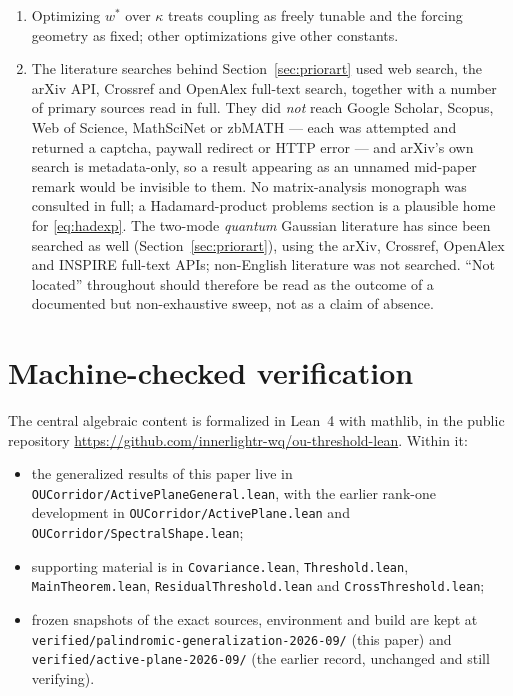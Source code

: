 \documentclass[11pt]{article}
\theoremstyle{plain}
\theoremstyle{definition}
\theoremstyle{remark}
\begin{document}
\begin{enumerate}
  and forced nodes satisfy the hypothesis, and no general bound on $w^{*}_{\min}$ over graphs.
\item Optimizing $w^{*}$ over $\kappa$ treats coupling as freely tunable and the forcing
  geometry as fixed; other optimizations give other constants.
\item The literature searches behind Section~\ref{sec:priorart} used web search, the arXiv API,
  Crossref and OpenAlex full-text search, together with a number of primary sources read in
  full. They did \emph{not} reach Google Scholar, Scopus, Web of Science, MathSciNet or zbMATH ---
  each was attempted and returned a captcha, paywall redirect or HTTP error ---
  and arXiv's own search is metadata-only, so a result appearing as an unnamed mid-paper remark
  would be invisible to them. No matrix-analysis monograph was consulted in full; a
  Hadamard-product problems section is a plausible home for \eqref{eq:hadexp}. The two-mode \emph{quantum} Gaussian literature has since been searched as well
  (Section~\ref{sec:priorart}), using the arXiv, Crossref, OpenAlex and INSPIRE full-text APIs;
  non-English literature was not searched.
  ``Not located'' throughout should therefore be read as the outcome of a documented but
  non-exhaustive sweep, not as a claim of absence.
\end{enumerate}

\section{Machine-checked verification}\label{sec:lean}

The central algebraic content is formalized in Lean~4 with mathlib, in the public repository
\url{https://github.com/innerlightr-wq/ou-threshold-lean}. Within it:

\begingroup\small\raggedright
\begin{itemize}\itemsep2pt
\item the generalized results of this paper live in
  \texttt{OUCorridor/ActivePlaneGeneral.lean}, with the earlier rank-one development in
  \texttt{OUCorridor/ActivePlane.lean} and \texttt{OUCorridor/SpectralShape.lean};
\item supporting material is in \texttt{Covariance.lean}, \texttt{Threshold.lean},
  \texttt{MainTheorem.lean}, \texttt{ResidualThreshold.lean} and \texttt{CrossThreshold.lean};
\item frozen snapshots of the exact sources, environment and build are kept at
  \texttt{verified/palindromic-generalization-2026-09/} (this paper) and
  \texttt{verified/active-plane-2026-09/} (the earlier record, unchanged and still verifying).
\end{itemize}
\endgroup
\end{document}
